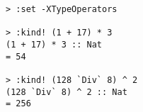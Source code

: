 \begin{repl}\begin{lstlisting}
> :set -XTypeOperators

> :kind! (1 + 17) * 3
(1 + 17) * 3 :: Nat
= 54

> :kind! (128 `Div` 8) ^ 2
(128 `Div` 8) ^ 2 :: Nat
= 256\end{lstlisting}\end{repl}
